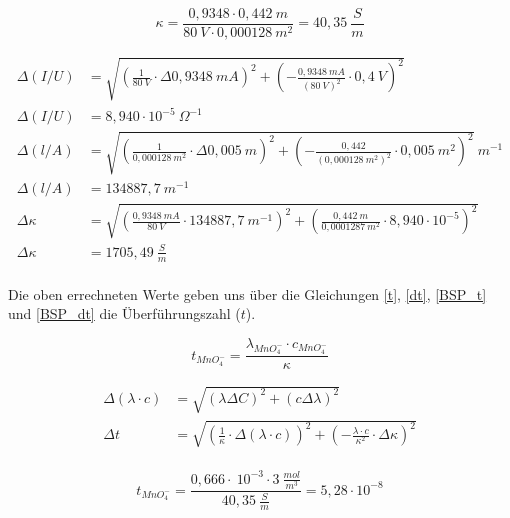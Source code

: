 \begin{equation}
\kappa = \frac{0,9348\cdot 0,442\ m}{80\ V\cdot 0,000128\ m^2} = 40,35\ \frac{S}{m}
\label{BSP_k}
\end{equation}

\begin{align}
\Delta(I/U) &= \sqrt{\left(\frac{1}{80\ V}\cdot \Delta 0,9348\ mA\right)^2 + \left(-\frac{0,9348\ mA}{(80\ V)^2}\cdot 0,4\ V\right)^2} \label{dIU}\\
\Delta(I/U) &= 8,940\cdot 10^{-5}\ \Omega^{-1}\\
\Delta(l/A) &= \sqrt{\left(\frac{1}{0,000128\ m^2}\cdot \Delta 0,005\ m\right)^2+\left(-\frac{0,442}{(0,000128\ m^2)^2}\cdot 0,005\ m^2\right)^2}\ m^{-1}\label{dLA}\\
\Delta(l/A) &= 134887,7\ m^{-1}\\
\Delta\kappa &= \sqrt{\left(\frac{0,9348\ mA}{80\ V}\cdot 134887,7\ m^{-1}\right)^2 + \left(\frac{0,442\ m}{0,0001287\ m^2}\cdot 8,940\cdot 10^{-5}\right)^2}\label{BSP_dk}\\
\Delta\kappa &= 1705,49\ \frac{S}{m}\\
\end{align}

\noindent Die oben errechneten Werte geben uns über die Gleichungen \ref{t}, \ref{dt}, \ref{BSP_t} und \ref{BSP_dt} die Überführungszahl ($t$).

\begin{equation}
t_{MnO_4^-} = \frac{\lambda_{MnO_4^-}\cdot c_{MnO_4^-}}{\kappa}
\label{t}
\end{equation}

\begin{align}
\Delta (\lambda\cdot c) &= \sqrt{ (\lambda\Delta C)^2 + (c\Delta\lambda)^2}\label{dlc}\\
\Delta t &= \sqrt{ \left(\frac{1}{\kappa}\cdot\Delta(\lambda\cdot c)\right)^2 + \left(-\frac{\lambda\cdot c}{\kappa^2}\cdot\Delta\kappa\right)^2}\label{dt}\\
\end{align}


\begin{equation}
t_{MnO_4^-} = \frac{0,666\cdot\ 10^{-3}\cdot 3\ \frac{mol}{m^3}}{40,35\ \frac{S}{m}} = 5,28\cdot 10^{-8}
\label{BSP_t}
\end{equation}

